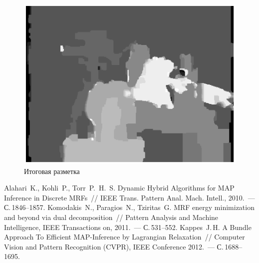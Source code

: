 \documentclass{article}
\begin{document}
\begin{figure}[t]
\centering
\includegraphics[width=\textwidth]{adaptive_result.eps}
\caption{Итоговая разметка}
\end{figure}
\pagebreak


\begin{thebibliography}{1}
    {Alahari~K., Kohli~P., Torr~P.~H.~S.}
    {Dynamic Hybrid Algorithms for MAP Inference in Discrete MRFs}~//
    {IEEE} Trans. Pattern Anal. Mach. Intell., 2010.~--- С.\,1846--1857.
    {Komodakis~N., Paragios~N., Tziritas~G.}
    {MRF energy minimization and beyond via dual decomposition}~//
    Pattern Analysis and Machine Intelligence, IEEE Transactions on, 2011.~--- С.\,531--552.
    {Kappes~J.\,H.}
    {A Bundle Approach To Efficient MAP-Inference by Lagrangian Relaxation}~//
    Computer Vision and Pattern Recognition (CVPR), IEEE Conference 2012.~--- С.\,1688--1695.
\end{thebibliography}
\end{document}
